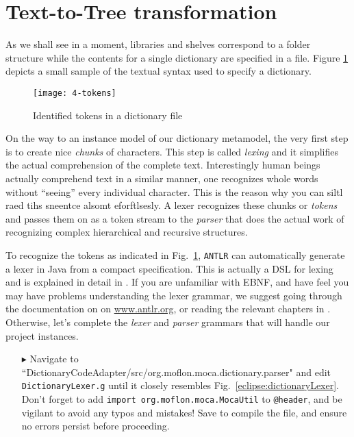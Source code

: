 \newpage
\section{Text-to-Tree transformation}
\genHeader

As we shall see in a moment, libraries and shelves correspond to a folder structure while the contents for a single dictionary are specified in a file.
Figure \ref{fig:moca-4-Tokens} depicts a small sample of the textual syntax used to specify a dictionary. 

\begin{figure}[!htbp]
\begin{center}
 \texttt{[image: 4-tokens]}
  \caption{Identified tokens in a dictionary file \update}
  \label{fig:moca-4-Tokens}
\end{center}
\end{figure}

On the way to an instance model of our dictionary metamodel, the very first step is to create nice \emph{chunks} of characters. This step is called
\emph{lexing} and it simplifies the actual comprehension of the complete text. Interestingly human beings actually comprehend text in a similar manner, one
recognizes whole words without ``seeing'' every individual character. This is the reason why you can siltl raed tihs sneentce alsomt eforftlsesly. A lexer
recognizes these chunks or \emph{tokens} and passes them on as a token stream to the \emph{parser} that does the actual work of recognizing complex
hierarchical and recursive structures.
   
To recognize the tokens as indicated in Fig.~\ref{fig:moca-4-Tokens}, \texttt{ANTLR} can automatically generate a lexer in Java from a compact specification.
This is actually a DSL for lexing and is explained in detail in \cite{ANTLR}. If you are unfamiliar with EBNF, and have feel you may have problems understanding
the lexer grammar, we suggest going through the documentation on on \url{www.antlr.org}, or reading the relevant chapters in \cite{ANTLR}. Otherwise, let's
complete the \emph{lexer} and \emph{parser} grammars that will handle our project instances.

\begin{itemize}
  
\item[$\blacktriangleright$] Navigate to ``Diction\-ary\-Code\-Adap\-ter/src/org.moflon.moca.dict\-ion\-ary\-.pars\-er" and edit \texttt{DictionaryLexer.g}
until it closely resembles Fig.~\ref{eclipse:dictionaryLexer}. Don't forget to add \texttt{import org.moflon.moca.MocaUtil} to \texttt{@header}, and be vigilant
to avoid any typos and mistakes! Save to compile the file, and ensure no errors persist before proceeding.

\end{itemize}
\newpage

